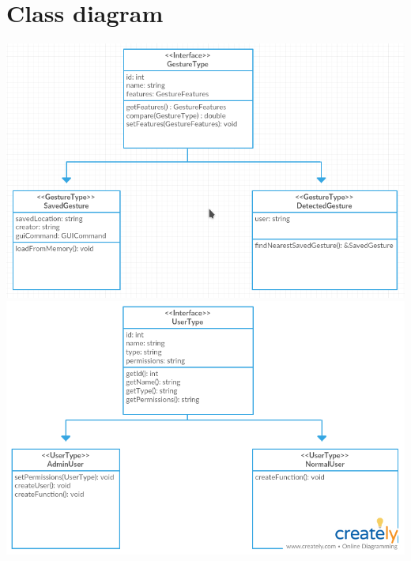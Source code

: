 \documentclass{scrreprt}
\begin{document}
\section{Class diagram}
\begin{center}
    \includegraphics[width=14cm]{classdiagram.png}
    \vspace{10cm}
    \includegraphics[width=14cm]{UserClass.png}
\end{center}
\end{document}
